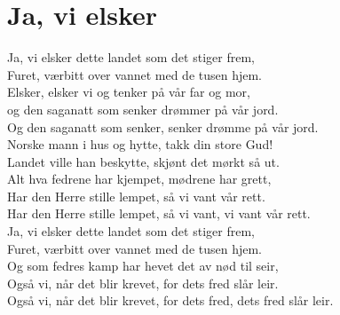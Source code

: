 \section{Ja, vi elsker}
Ja, vi elsker dette landet som det stiger frem,\\
Furet, værbitt over vannet med de tusen hjem.\\
Elsker, elsker vi og tenker på vår far og mor,\\
og den saganatt som senker drømmer på vår jord.\\
Og den saganatt som senker, senker drømme på vår jord.\\

Norske mann i hus og hytte, takk din store Gud!\\
Landet ville han beskytte, skjønt det mørkt så ut.\\
Alt hva fedrene har kjempet, mødrene har grett,\\
Har den Herre stille lempet, så vi vant vår rett.\\
Har den Herre stille lempet, så vi vant, vi vant vår rett.\\

Ja, vi elsker dette landet som det stiger frem,\\
Furet, værbitt over vannet med de tusen hjem.\\
Og som fedres kamp har hevet det av nød til seir,\\
Også vi, når det blir krevet, for dets fred slår leir.\\
Også vi, når det blir krevet, for dets fred, dets fred slår leir.\\